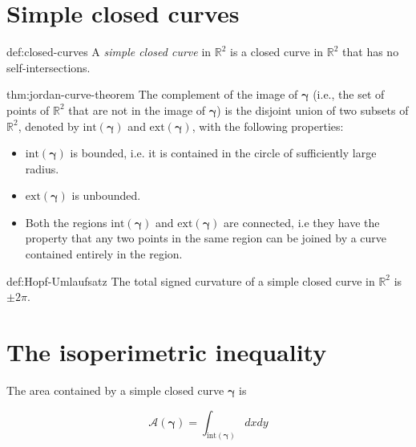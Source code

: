 \documentclass{notes}
\newcommand{\bgamma}{\bm{\gamma}}
\begin{document}
\section{Simple closed curves}

\begin{definition}{def:closed-curves}
	A \textit{simple closed curve} in \(\mathbb{R}^2\) is a closed curve in \(\mathbb{R}^2\) that has no self-intersections.
\end{definition}

\begin{theorem}{thm:jordan-curve-theorem}
The complement of the image of \(\bgamma\)
(i.e., the set of points of \(\mathbb{R}^2\) that are not in the image of $\bgamma$) is the disjoint
union of two subsets of \(\mathbb{R}^2\), denoted by \(\mathrm{int}( \bgamma)\) and \(\mathrm{ext}(\bgamma)\), with the following
properties:

\begin{itemize}
	\item \(\mathrm{int}(\bgamma)\) is bounded, i.e. it is contained in the circle of sufficiently large radius.
	\item \(\mathrm{ext}(\bgamma)\) is unbounded.
	\item Both the regions \(\mathrm{int}(\bgamma)\) and \(\mathrm{ext}(\bgamma)\) are connected, i.e they have the property that any two points in the same region can be joined by a curve contained entirely in the region. 
\end{itemize}

\end{theorem}

\begin{theorem}{def:Hopf-Umlaufsatz}
The total signed curvature of a simple closed curve in \(\mathbb{R}^2\) is \(\pm 2\pi\).
\end{theorem}


\section{The isoperimetric inequality}


\begin{definition}{}
	The area contained by a simple closed curve \(\bgamma\) is
	
\[\mathcal{A}(\bgamma) =\int_{\mathrm{int}(\bgamma)} dx dy\]

\end{definition}
\end{document}
